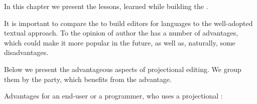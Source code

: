 

In this chapter we present the lessons, learned while building the \pcpp.



  It is important to compare the  to build editors for languages to the well-adopted 
  textual approach. To the opinion of author the  has a number of advantages, 
  which could make it more popular in the future, as well as, naturally, some disadvantages.
  
  Below we present the advantageous aspects of projectional editing. We group them by the party, 
  which benefits from the advantage.
  
  Advantages for an end-user or a programmer, who uses a projectional :
  
